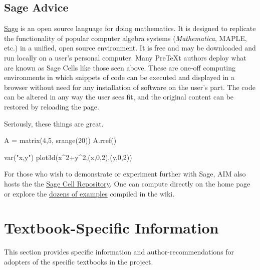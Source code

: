 \documentclass[10pt,]{article}
\begin{document}
\subsection[{Sage Advice}]{Sage Advice}\label{subsection-sage-cells}
\hypertarget{p-10}{}%
\href{https://www.sagemath.org/}{Sage} is an open source language for doing mathematics. It is designed to replicate the functionality of popular computer algebra systems (\emph{Mathematica}, MAPLE, etc.) in a unified, open source environment. It is free and may be downloaded and run locally on a user's personal computer. Many PreTeXt authors deploy what are known as Sage Cells like those seen above. These are one-off computing environments in which snippets of code can be executed and displayed in a browser without need for any installation of software on the user's part. The code can be altered in any way the user sees fit, and the original content can be restored by reloading the page.%
\par
\hypertarget{p-11}{}%
Seriously, these things are great.%
\begin{sageinput}
A = matrix(4,5, srange(20))
A.rref()
\end{sageinput}
\begin{sageoutput}
[ 1  0 -1 -2 -3]
[ 0  1  2  3  4]
[ 0  0  0  0  0]
[ 0  0  0  0  0]
\end{sageoutput}
\begin{sageinput}
var("x,y")
plot3d(x^2+y^2,(x,0,2),(y,0,2))
\end{sageinput}
\hypertarget{p-12}{}%
For those who wish to demonstrate or experiment further with Sage, AIM also hosts the the \href{https://utmost.aimath.org/sage-cell-repository/}{Sage Cell Repository}. One can compute directly on the home page or explore the \href{http://utmost-sage-cell.org/topics}{dozens of examples} compiled in the wiki.%
\typeout{************************************************}
\typeout{************************************************}
\section[{Textbook-Specific Information}]{Textbook-Specific Information}\label{section-textbook-specifics}
\hypertarget{p-13}{}%
This section provides specific information and author-recommendations for adopters of the specific textbooks in the project.%
\typeout{************************************************}
\typeout{************************************************}
\end{document}
